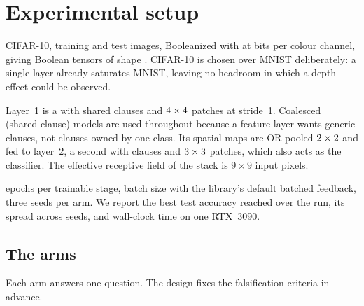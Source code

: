 \section{Experimental setup}
\label{sec:setup}

 CIFAR-10, \nTrain{} training and \nTest{} test images, Booleanized with
 at \nBits{} bits per colour channel, giving Boolean tensors
of shape \inShape{}. CIFAR-10 is chosen over MNIST deliberately: a single-layer \ctm already
saturates MNIST, leaving no headroom in which a depth effect could be observed.

 Layer~1 is a  with \cOne{} shared
clauses and $4{}\times4{}$ patches at stride~1. Coalesced (shared-clause) models are
used throughout because a feature layer wants generic clauses, not clauses owned by one
class. Its spatial maps are OR-pooled $2{}\times2{}$ and fed to layer~2, a second
 with \cTwo{} clauses and $3{}\times3{}$
patches, which also acts as the classifier. The effective receptive field of the stack is
$9\times9$ input pixels.

 \epochsRun{} epochs per trainable stage, batch size \batchSize{} with the
library's default batched feedback, three seeds per arm. We report the best test accuracy
reached over the run, its spread across seeds, and wall-clock time on one RTX~3090.

\subsection{The arms}

Each arm answers one question. The design fixes the falsification criteria in advance.

